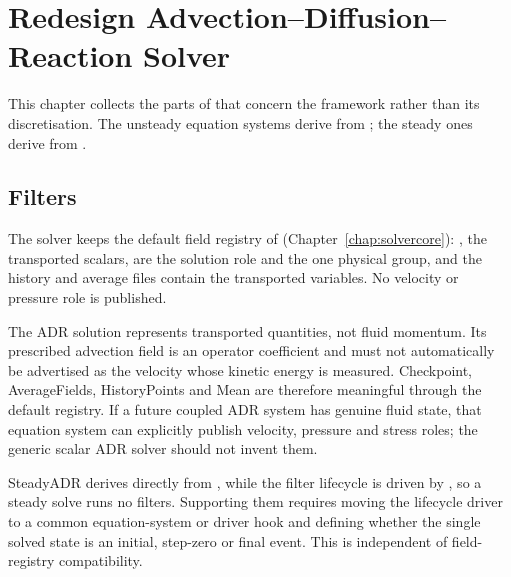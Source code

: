 \chapter{Redesign Advection--Diffusion--Reaction Solver}
\label{chap:redesign-adr}

This chapter collects the parts of  that concern the
 framework rather than its discretisation. The unsteady
equation systems derive from ; the steady
ones derive from .

\section{Filters}
\label{sec:redesign-adr-filters}

The solver keeps the default field registry of 
(Chapter~\ref{chap:solvercore}): , the transported scalars,
are the solution role and the one physical group, and the history and average
files contain the transported variables. No velocity or pressure role is
published.

The ADR solution represents transported quantities, not fluid momentum. Its
prescribed advection field is an operator coefficient and must not
automatically be advertised as the velocity whose kinetic energy is measured.
Checkpoint, AverageFields, HistoryPoints and Mean are therefore meaningful
through the default registry. If a future coupled ADR system has genuine fluid
state, that equation system can explicitly publish velocity, pressure and
stress roles; the generic scalar ADR solver should not invent them.

SteadyADR derives directly from , while the filter
lifecycle is driven by , so a steady solve runs no
filters. Supporting them requires moving the lifecycle driver to a common
equation-system or driver hook and defining whether the single solved state is
an initial, step-zero or final event. This is independent of field-registry
compatibility.
